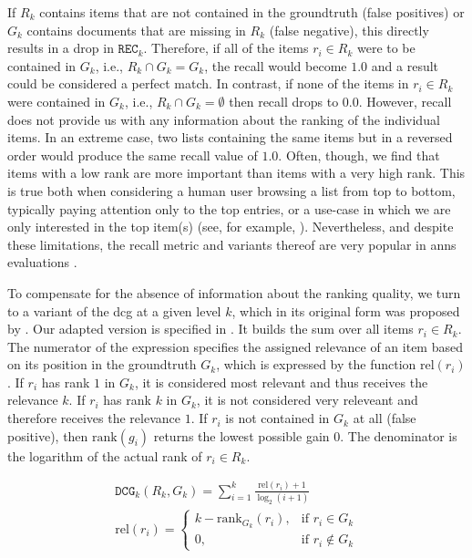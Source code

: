 If $R_k$ contains items that are not contained in the groundtruth (false positives) or $G_k$ contains documents that are missing in $R_k$ (false negative), this directly results in a drop in $\texttt{REC}_k$. Therefore, if all of the items $r_i \in R_k$ were to be contained in $G_k$, i.e., $R_k \cap G_k = G_k$, the recall would become $1.0$ and a result could be considered a perfect match. In contrast, if none of the items in $r_i \in R_k$ were contained in $G_k$, i.e., $R_k \cap G_k = \emptyset$ then recall drops to $0.0$. However, recall does not provide us with any information about the ranking of the individual items. In an extreme case, two lists containing the same items but in a reversed order would produce the same recall value of $1.0$. Often, though, we find that items with a low rank are more important than items with a very high rank. This is true both when considering a human user browsing a list from top to bottom, typically paying attention only to the top entries, or a use-case in which we are only interested in the top item(s) (see, for example, ). Nevertheless, and despite these limitations, the recall metric and variants thereof are very popular in \acrshort{anns} evaluations \cite{Aumueller:2017ANN,Simhadri:2022Results}. 

To compensate for the absence of information about the ranking quality, we turn to a variant of the \acrshort{dcg} at a given level $k$, which in its original form was proposed by \cite{Jarvelin:2002Cumulated}. Our adapted version is specified in . It builds the sum over all items $r_i \in R_k$. The numerator of the expression specifies the assigned relevance of an item based on its position in the groundtruth $G_k$, which is expressed by the function $\text{rel} (r_i)$. If $r_i$ has rank $1$ in $G_k$, it is considered most relevant and thus receives the relevance $k$. If $r_i$ has rank $k$ in $G_k$, it is not considered very releveant and therefore receives the relevance $1$. If $r_i$ is not contained in $G_k$ at all (false positive), then $\text{rank} (g_i)$ returns the lowest possible gain $0$. The denominator is the logarithm of the actual rank of $r_i \in R_k$. 

\begin{eqnarray}
\label{equation:dcg}
\mathtt{DCG}_k (R_k, G_k)= \sum_{i = 1}^{k} \frac{\text{rel}(r_i) + 1}{\log_2(i + 1)} \\
\text{rel} (r_i) = 
    \begin{cases}
        k - \text{rank}_{G_k}(r_i), &  \text{if } r_i \in G_k \\
        0,                          &  \text{if } r_i \notin G_k
    \end{cases}
\end{eqnarray}

